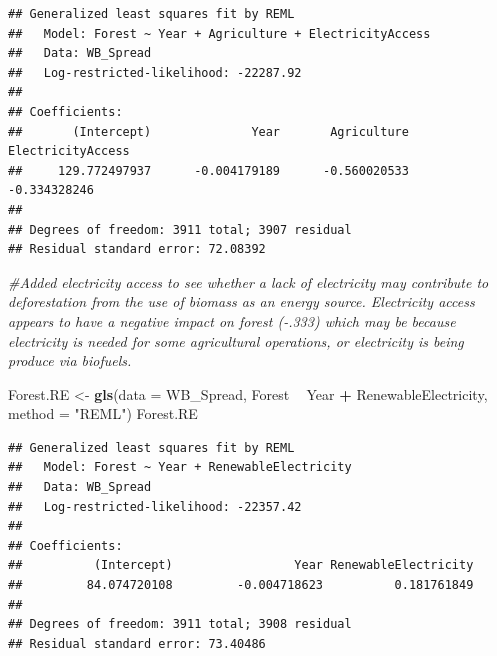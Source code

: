 \documentclass[12pt,]{article}
\newenvironment{Shaded}{\begin{snugshade}}{\end{snugshade}}
\newcommand{\KeywordTok}[1]{\textcolor[rgb]{0.13,0.29,0.53}{\textbf{#1}}}
\newcommand{\DataTypeTok}[1]{\textcolor[rgb]{0.13,0.29,0.53}{#1}}
\newcommand{\StringTok}[1]{\textcolor[rgb]{0.31,0.60,0.02}{#1}}
\newcommand{\CommentTok}[1]{\textcolor[rgb]{0.56,0.35,0.01}{\textit{#1}}}
\newcommand{\OperatorTok}[1]{\textcolor[rgb]{0.81,0.36,0.00}{\textbf{#1}}}
\newcommand{\NormalTok}[1]{#1}
\begin{document}
\begin{verbatim}
## Generalized least squares fit by REML
##   Model: Forest ~ Year + Agriculture + ElectricityAccess 
##   Data: WB_Spread 
##   Log-restricted-likelihood: -22287.92
## 
## Coefficients:
##       (Intercept)              Year       Agriculture ElectricityAccess 
##     129.772497937      -0.004179189      -0.560020533      -0.334328246 
## 
## Degrees of freedom: 3911 total; 3907 residual
## Residual standard error: 72.08392
\end{verbatim}

\begin{Shaded}
\begin{Highlighting}[]
\CommentTok{#Added electricity access to see whether a lack of electricity may contribute to deforestation from the use of biomass as an energy source. Electricity access appears to have a negative impact on forest (-.333) which may be because electricity is needed for some agricultural operations, or electricity is being produce via biofuels. }

\NormalTok{Forest.RE <-}\StringTok{ }\KeywordTok{gls}\NormalTok{(}\DataTypeTok{data =}\NormalTok{ WB_Spread, }
\NormalTok{                    Forest }\OperatorTok{~}\StringTok{ }\NormalTok{Year }\OperatorTok{+}\StringTok{ }\NormalTok{RenewableElectricity,}
                    \DataTypeTok{method =} \StringTok{"REML"}\NormalTok{)}
\NormalTok{Forest.RE}
\end{Highlighting}
\end{Shaded}

\begin{verbatim}
## Generalized least squares fit by REML
##   Model: Forest ~ Year + RenewableElectricity 
##   Data: WB_Spread 
##   Log-restricted-likelihood: -22357.42
## 
## Coefficients:
##          (Intercept)                 Year RenewableElectricity 
##         84.074720108         -0.004718623          0.181761849 
## 
## Degrees of freedom: 3911 total; 3908 residual
## Residual standard error: 73.40486
\end{verbatim}

\begin{Shaded}
\end{Shaded}
\end{document}
